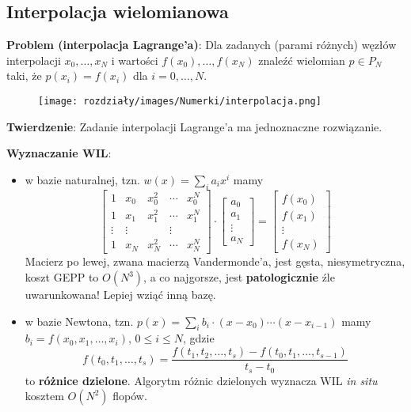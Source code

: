 \subsection{Interpolacja wielomianowa}

\textbf{Problem (interpolacja Lagrange'a)}:
Dla zadanych (parami różnych) węzłów interpolacji $x_0,\ldots,x_N$ i wartości $f(x_0),\ldots,f(x_N)$ znaleźć wielomian $p\in P_N$ taki, że $p(x_i)=f(x_i)$ dla $i=0,\ldots,N$.
\begin{figure}[H]
    \centering
    \texttt{[image: rozdziały/images/Numerki/interpolacja.png]}
\end{figure}

\textbf{Twierdzenie}:
Zadanie interpolacji Lagrange'a ma jednoznaczne rozwiązanie.

\textbf{Wyznaczanie WIL}:
\begin{itemize}
    \item w bazie naturalnej, tzn. $w(x)=\sum_ia_ix^i$ mamy
    $$
    \begin{bmatrix}
        1 & x_0 & x_0^2 & \cdots & x_0^N \\
        1 & x_1 & x_1^2 & \cdots & x_1^N \\
        \vdots & \vdots & & \vdots & \\
        1 & x_N & x_N^2 & \cdots & x_N^N
    \end{bmatrix} \cdot \begin{bmatrix}
        a_0 \\
        a_1 \\
        \vdots \\
        a_N
    \end{bmatrix} = \begin{bmatrix}
        f(x_0) \\
        f(x_1) \\
        \vdots \\
        f(x_N)
    \end{bmatrix}
    $$
    Macierz po lewej, zwana macierzą Vandermonde'a, jest gęsta, niesymetryczna, koszt GEPP to $O(N^3)$, a co najgorsze, jest \textbf{patologicznie} źle uwarunkowana! Lepiej wziąć inną bazę.
    \item w bazie Newtona, tzn. $p(x)=\sum_ib_i\cdot(x-x_0)\cdots(x-x_{i-1})$ mamy $b_i=f(x_0,x_1,\ldots,x_i)$, $0\leq i\leq N$, gdzie
    $$
    f(t_0,t_1,\ldots,t_s)=\frac{f(t_1,t_2,\ldots,t_s)-f(t_0,t_1,\ldots,t_{s-1})}{t_s-t_0}
    $$
    to \textbf{różnice dzielone}. Algorytm różnic dzielonych wyznacza WIL \textit{in situ} kosztem $O(N^2)$ flopów.

\end{itemize}
